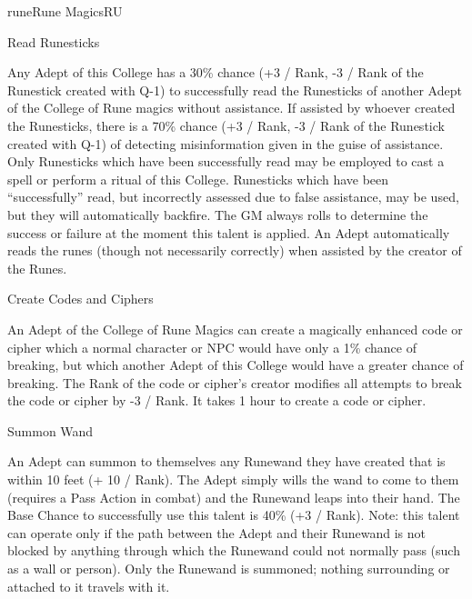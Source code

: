 \begin{college}[1.1]{rune}{Rune Magics}{RU}
\begin{talent}[T-3]{Read Runesticks}

\begin{effects}
Any Adept of this College has a 30\% chance (+3 / Rank, -3 / Rank of the
Runestick created with Q-1) to successfully read the Runesticks of
another Adept of the College of Rune magics without assistance.  If
assisted by whoever created the Runesticks, there is a 70\% chance
(+3 / Rank, -3 / Rank of the Runestick created with Q-1) of detecting
misinformation given in the guise of assistance.  Only Runesticks
which have been successfully read may be employed to cast a spell or
perform a ritual of this College.  Runesticks which have been
``successfully'' read, but incorrectly assessed due to false assistance,
may be used, but they will automatically backfire.  The GM always
rolls to determine the success or failure at the moment this talent is
applied.  An Adept automatically reads the runes (though not
necessarily correctly) when assisted by the creator of the Runes.
\end{effects}
\end{talent}

\begin{talent}[T-4]{Create Codes and Ciphers}
\begin{effects}
An Adept of the College of Rune Magics can create a magically enhanced
code or cipher which a normal character or NPC would have only a 1\%
chance of breaking, but which another Adept of this College would have
a greater chance of breaking.  The Rank of the code or cipher's
creator modifies all attempts to break the code or cipher by -3 /
Rank.  It takes 1 hour to create a code or cipher.
\end{effects}
\end{talent}

\begin{talent}[T-5]{Summon Wand}

\begin{effects}
An Adept can summon to themselves any Runewand they have created that
is within 10 feet (+ 10 / Rank).  The Adept simply wills the wand to
come to them (requires a Pass Action in combat) and the Runewand leaps
into their hand.  The Base Chance to successfully use this talent is
40\% (+3 / Rank).  Note: this talent can operate only if the path
between the Adept and their Runewand is not blocked by anything
through which the Runewand could not normally pass (such as a wall or
person).  Only the Runewand is summoned; nothing surrounding or
attached to it travels with it.
\end{effects}
\end{talent}


\end{college}
